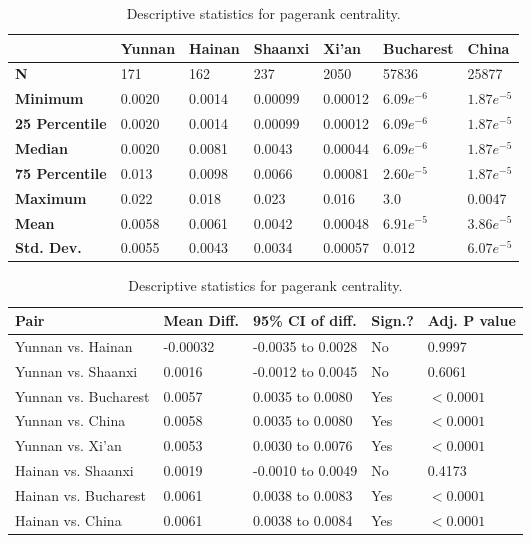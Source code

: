\begin{table}[h]
	\begin{mdframed}
		\begin{tabular*}{\linewidth}{l|llllll}
			\hline
			\textbf{ } & \textbf{Yunnan} & \textbf{Hainan} & \textbf{Shaanxi} & \textbf{Xi'an} & \textbf{Bucharest} & \textbf{China}\\
			\hline
			\textbf{N} & 171 & 162 & 237 & 2050 & 57836 & 25877\\
			\textbf{Minimum} & 0.0020 & 0.0014 & 0.00099 & 0.00012 & $6.09e^{-6}$ & $1.87e^{-5}$\\
			\textbf{25 Percentile} & 0.0020 & 0.0014 & 0.00099 & 0.00012 & $6.09e^{-6}$ & $1.87e^{-5}$\\
			\textbf{Median} & 0.0020 & 0.0081 & 0.0043 & 0.00044 & $6.09e^{-6}$ & $1.87e^{-5}$\\
			\textbf{75 Percentile} & 0.013 & 0.0098 & 0.0066 & 0.00081 & $2.60e^{-5}$ & $1.87e^{-5}$\\
			\textbf{Maximum} & 0.022 & 0.018 & 0.023 & 0.016 & 3.0 & 0.0047\\
			\textbf{Mean} & 0.0058 & 0.0061 & 0.0042 & 0.00048 & $6.91e^{-5}$ & $3.86e^{-5}$\\
			\textbf{Std. Dev.} & 0.0055 & 0.0043 & 0.0034 & 0.00057 & 0.012 & $6.07e^{-5}$\\
			\hline
		\end{tabular*}
		\caption{Descriptive statistics for pagerank centrality.}
		\label{tab:pagerank_centrality_desc}
		\vskip 10pt
		\small
		\begin{tabular*}{\linewidth}{l|llll}
			\hline
			\textbf{Pair} & \textbf{Mean Diff.} & \textbf{95\% CI of diff.} & \textbf{Sign.?} & \textbf{Adj. P value}\\
			\hline
			Yunnan vs. Hainan & -0.00032 & -0.0035 to 0.0028 & No & 0.9997\\
			Yunnan vs. Shaanxi & 0.0016 & -0.0012 to 0.0045 & No & 0.6061\\
			Yunnan vs. Bucharest & 0.0057 & 0.0035 to 0.0080 & Yes & $<0.0001$\\
			Yunnan vs. China & 0.0058 & 0.0035 to 0.0080 & Yes & $<0.0001$\\
			Yunnan vs. Xi'an & 0.0053 & 0.0030 to 0.0076 & Yes & $<0.0001$\\
			Hainan vs. Shaanxi & 0.0019 & -0.0010 to 0.0049 & No & 0.4173\\
			Hainan vs. Bucharest & 0.0061 & 0.0038 to 0.0083 & Yes & $<0.0001$\\
			Hainan vs. China & 0.0061 & 0.0038 to 0.0084 & Yes & $<0.0001$\\

\end{tabular*}
\end{mdframed}
\end{table}
